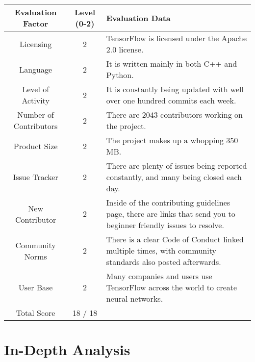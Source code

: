 \documentclass[12pt]{article}
\begin{document}
\begin{enumerate}
		\hspace*{-1cm}
		\noindent\begin{tabular}{ | c | c | L | } 
			\hline
			Evaluation Factor & Level (0-2) & Evaluation Data \\\hline
			Licensing & 2 & TensorFlow is licensed under the Apache 2.0 license. \\\hline
			Language & 2 & It is written mainly in both C++ and Python. \\\hline
			Level of Activity & 2 & It is constantly being updated with well over one hundred commits each week. \\\hline		
			Number of Contributors & 2 & There are 2043 contributors working on the project. \\\hline
			Product Size & 2 & The project makes up a whopping 350 MB. \\\hline
			Issue Tracker & 2 & There are plenty of issues being reported constantly, and many being closed each day. \\\hline
			New Contributor & 2 & Inside of the contributing guidelines page, there are links that send you to beginner friendly issues to resolve. \\\hline
			Community Norms & 2 & There is a clear Code of Conduct linked multiple times, with community standards also posted afterwards. \\\hline
			User Base & 2 & Many companies and users use TensorFlow across the world to create neural networks. \\\hline
			Total Score & 18 / 18 & \\\hline
		\end{tabular}
	
	\end{enumerate}
	
	\section{In-Depth Analysis}
	
\end{document}
